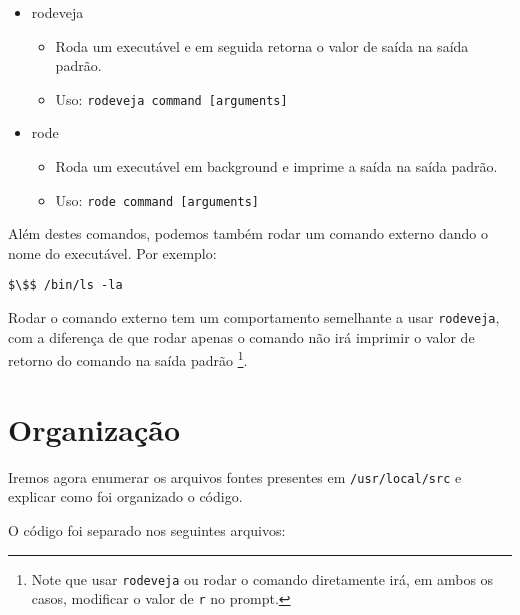 \documentclass{amsart}
\theoremstyle{plain}
\newcommand{\code}[1]{\lstinline[mathescape=true]{#1}}
\newcommand{\mcode}[1]{\lstinline[mathescape]!#1!}
\begin{document}
\begin{itemize}
\begin{itemize}
    \end{itemize}
  \item rodeveja
    \begin{itemize}
      \item Roda um executável e em seguida retorna o valor de saída na saída padrão.
      \item Uso: \mcode{rodeveja command [arguments]}
    \end{itemize}
  \item rode
    \begin{itemize}
      \item Roda um executável em background e imprime a saída na saída padrão.
      \item Uso: \mcode{rode command [arguments]}
    \end{itemize}
\end{itemize}

Além destes comandos, podemos também rodar um comando externo dando o nome do executável. Por
exemplo:

\begin{lstlisting}[mathescape=true,style=nonumbers]
  $\$$ /bin/ls -la
\end{lstlisting}

Rodar o comando externo tem um comportamento semelhante a usar \code{rodeveja}, com a diferença de
que rodar apenas o comando não irá imprimir o valor de retorno do comando na saída padrão%
\footnote{Note que usar \code{rodeveja} ou rodar o comando diretamente irá, em ambos os casos,
modificar o valor de \code{r} no prompt.}.

\section{Organização}

Iremos agora enumerar os arquivos fontes presentes em \code{/usr/local/src} e explicar como foi
organizado o código.

O código foi separado nos seguintes arquivos:

\end{document}
